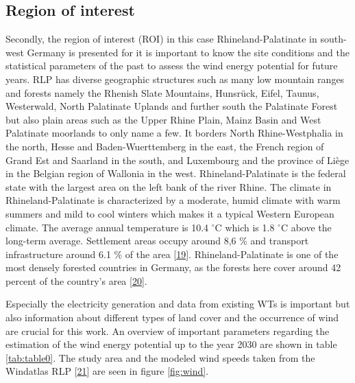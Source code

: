 \documentclass[a4paper,11pt]{article}
\begin{document}
\hypertarget{region-of-interest}{%
\subsection{Region of interest}\label{region-of-interest}}

Secondly, the region of interest (ROI) in this case Rhineland-Palatinate in south-west Germany is presented for it is important to know the site conditions and the statistical parameters of the past to assess the wind energy potential for future years. RLP has diverse geographic structures such as many low mountain ranges and forests namely the Rhenish Slate Mountains, Hunsrück, Eifel, Taunus, Westerwald, North Palatinate Uplands and further south the Palatinate Forest but also plain areas such as the Upper Rhine Plain, Mainz Basin and West Palatinate moorlands to only name a few. It borders North Rhine-Westphalia in the north, Hesse and Baden-Wuerttemberg in the east, the French region of Grand Est and Saarland in the south, and Luxembourg and the province of Liège in the Belgian region of Wallonia in the west. Rhineland-Palatinate is the federal state with the largest area on the left bank of the river Rhine. The climate in Rhineland-Palatinate is characterized by a moderate, humid climate with warm summers and mild to cool winters which makes it a typical Western European climate. The average annual temperature is 10.4 \(^\circ\)C which is 1.8 \(^\circ\)C above the long-term average. Settlement areas occupy around 8,6 \% and transport infrastructure around 6.1 \% of the area {[}\protect\hyperlink{ref-StateStatisticalOfficeofRhinelandPalatinate.2020}{19}{]}. Rhineland-Palatinate is one of the most densely forested countries in Germany, as the forests here cover around 42 percent of the country's area {[}\protect\hyperlink{ref-HansenandLamour.2021}{20}{]}.

Especially the electricity generation and data from existing WTs is important but also information about different types of land cover and the occurrence of wind are crucial for this work. An overview of important parameters regarding the estimation of the wind energy potential up to the year 2030 are shown in table \ref{tab:table0}. The study area and the modeled wind speeds taken from the Windatlas RLP {[}\protect\hyperlink{ref-MinisteriumfurWirtschaftKlimaschutzEnergieundLandesplanung.2013}{21}{]} are seen in figure \ref{fig:wind}.
\end{document}
